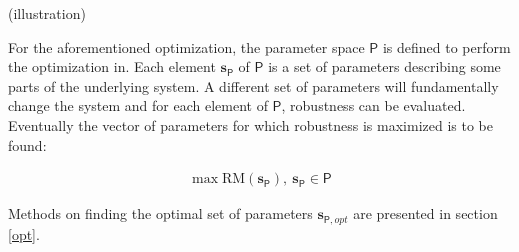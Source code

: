     (illustration)

    For the aforementioned optimization, the parameter space $\mathsf{P}$ is defined to perform the optimization in. Each element $\mathbf{s}_{\mathsf{P}}$ of $\mathsf{P}$ is a set of parameters describing some parts of the underlying system. A different set of parameters will fundamentally change the system and for each element of $\mathsf{P}$, robustness can be evaluated. Eventually the vector of parameters for which robustness is maximized is to be found:

    \begin{gather}\label{eq:10} \max \text{RM}(\mathbf{s}_{\mathsf{P}}),\ \mathbf{s}_{\mathsf{P}}  \in \mathsf{P}\end{gather}

    Methods on finding the optimal set of parameters $\mathbf{s}_{\mathsf{P},opt}$ are presented in section \ref{opt}.









